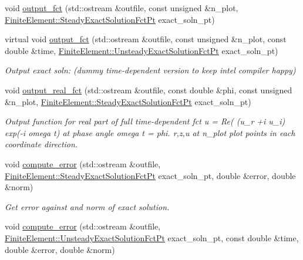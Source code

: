 \begin{DoxyCompactItemize}
void \hyperlink{classoomph_1_1FourierDecomposedHelmholtzEquations_a9024cd81a80a4709b127560b6f15cd43}{output\+\_\+fct} (std\+::ostream \&outfile, const unsigned \&n\+\_\+plot, \hyperlink{classoomph_1_1FiniteElement_a690fd33af26cc3e84f39bba6d5a85202}{Finite\+Element\+::\+Steady\+Exact\+Solution\+Fct\+Pt} exact\+\_\+soln\+\_\+pt)
\item 
virtual void \hyperlink{classoomph_1_1FourierDecomposedHelmholtzEquations_a4a094945d74be0e025895f240d4b0072}{output\+\_\+fct} (std\+::ostream \&outfile, const unsigned \&n\+\_\+plot, const double \&time, \hyperlink{classoomph_1_1FiniteElement_ad4ecf2b61b158a4b4d351a60d23c633e}{Finite\+Element\+::\+Unsteady\+Exact\+Solution\+Fct\+Pt} exact\+\_\+soln\+\_\+pt)
\begin{DoxyCompactList}\small\item\em Output exact soln\+: (dummy time-\/dependent version to keep intel compiler happy) \end{DoxyCompactList}\item 
void \hyperlink{classoomph_1_1FourierDecomposedHelmholtzEquations_a08a9a9f9bc2fa29c994cb78533b72b34}{output\+\_\+real\+\_\+fct} (std\+::ostream \&outfile, const double \&phi, const unsigned \&n\+\_\+plot, \hyperlink{classoomph_1_1FiniteElement_a690fd33af26cc3e84f39bba6d5a85202}{Finite\+Element\+::\+Steady\+Exact\+Solution\+Fct\+Pt} exact\+\_\+soln\+\_\+pt)
\begin{DoxyCompactList}\small\item\em Output function for real part of full time-\/dependent fct u = Re( (u\+\_\+r +i u\+\_\+i) exp(-\/i omega t) at phase angle omega t = phi. r,z,u at n\+\_\+plot plot points in each coordinate direction. \end{DoxyCompactList}\item 
void \hyperlink{classoomph_1_1FourierDecomposedHelmholtzEquations_acb86a7b5d92e82a96a6aa8df90057551}{compute\+\_\+error} (std\+::ostream \&outfile, \hyperlink{classoomph_1_1FiniteElement_a690fd33af26cc3e84f39bba6d5a85202}{Finite\+Element\+::\+Steady\+Exact\+Solution\+Fct\+Pt} exact\+\_\+soln\+\_\+pt, double \&error, double \&norm)
\begin{DoxyCompactList}\small\item\em Get error against and norm of exact solution. \end{DoxyCompactList}\item 
void \hyperlink{classoomph_1_1FourierDecomposedHelmholtzEquations_afcdb1ba877140cb1b4c66c0e55c2a8a1}{compute\+\_\+error} (std\+::ostream \&outfile, \hyperlink{classoomph_1_1FiniteElement_ad4ecf2b61b158a4b4d351a60d23c633e}{Finite\+Element\+::\+Unsteady\+Exact\+Solution\+Fct\+Pt} exact\+\_\+soln\+\_\+pt, const double \&time, double \&error, double \&norm)

\end{DoxyCompactItemize}

